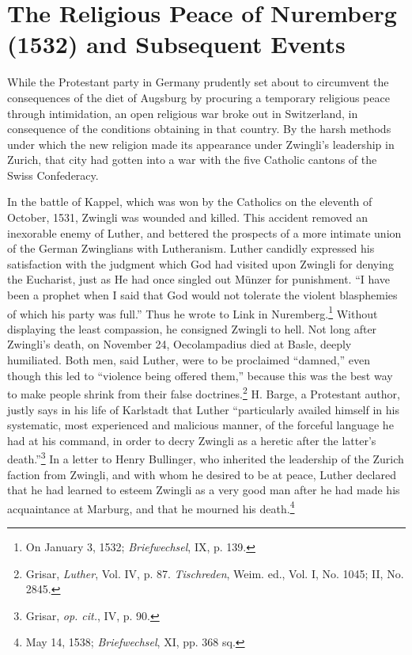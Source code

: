 \section{The Religious Peace of Nuremberg (1532) and Subsequent Events}

While the Protestant party in Germany prudently set about to
circumvent the consequences of the diet of Augsburg by procuring
a temporary religious peace through intimidation, an open religious
war broke out in Switzerland, in consequence of the conditions
obtaining in that country. By the harsh methods under which the
new religion made its appearance under Zwingli’s leadership in
Zurich, that city had gotten into a war with the five Catholic
cantons of the Swiss Confederacy.

In the battle of Kappel, which was won by the Catholics on the
eleventh of October, 1531, Zwingli was wounded and killed. This
accident removed an inexorable enemy of Luther, and bettered the
prospects of a more intimate union of the German Zwinglians with
Lutheranism. Luther candidly expressed his satisfaction with the
judgment which God had visited upon Zwingli for denying the Eucharist,
just as He had once singled out Münzer for punishment. “I
have been a prophet when I said that God would not tolerate the
violent blasphemies of which his party was full.” Thus he wrote to
Link in Nuremberg.\footnote{On January 3, 1532; \textit{Briefwechsel}, IX, p. 139.}
 Without displaying the least compassion, he
consigned Zwingli to hell. Not long after Zwingli’s death, on November
24, Oecolampadius died at Basle, deeply humiliated. Both men,
said Luther, were to be proclaimed “damned,” even though this led to
“violence being offered them,” because this was the best way to
make people shrink from their false doctrines.\footnote{Grisar, \textit{Luther}, Vol. IV, p. 87. \textit{Tischreden}, Weim. ed., Vol. I, No. 1045; II, No. 2845.}
 H. Barge, a Protestant
author, justly says in his life of Karlstadt that Luther “particularly
availed himself in his systematic, most experienced and malicious
manner, of the forceful language he had at his command, in order
to decry Zwingli as a heretic after the latter’s death.”\footnote{Grisar, \textit{op. cit.}, IV, p. 90.}
 In a letter
to Henry Bullinger, who inherited the leadership of the Zurich
faction from Zwingli, and with whom he desired to be at peace,
Luther declared that he had learned to esteem Zwingli as a very
good man after he had made his acquaintance at Marburg, and that
he mourned his death.\footnote{May 14, 1538; \textit{Briefwechsel}, XI, pp. 368 sq.}

